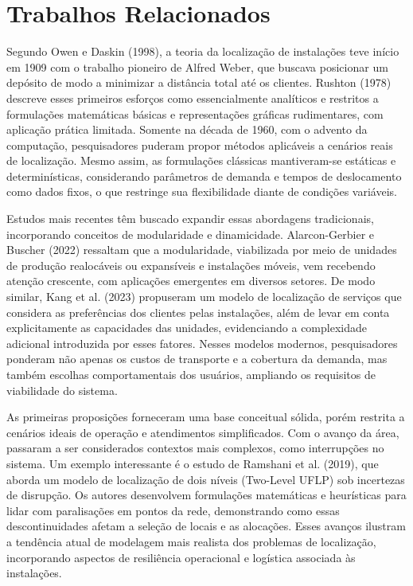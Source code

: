 \documentclass[12pt]{article}
\begin{document}
\section{Trabalhos Relacionados}

Segundo Owen e Daskin (1998), a teoria da localização de instalações teve início em 1909 com o trabalho pioneiro de Alfred Weber, que buscava posicionar um depósito de modo a minimizar a distância total até os clientes. Rushton (1978) descreve esses primeiros esforços como essencialmente analíticos e restritos a formulações matemáticas básicas e representações gráficas rudimentares, com aplicação prática limitada. Somente na década de 1960, com o advento da computação, pesquisadores puderam propor métodos aplicáveis a cenários reais de localização. Mesmo assim, as formulações clássicas mantiveram-se estáticas e determinísticas, considerando parâmetros de demanda e tempos de deslocamento como dados fixos, o que restringe sua flexibilidade diante de condições variáveis.

Estudos mais recentes têm buscado expandir essas abordagens tradicionais, incorporando conceitos de modularidade e dinamicidade. Alarcon-Gerbier e Buscher (2022) ressaltam que a modularidade, viabilizada por meio de unidades de produção realocáveis ou expansíveis e instalações móveis, vem recebendo atenção crescente, com aplicações emergentes em diversos setores. De modo similar, Kang et al. (2023) propuseram um modelo de localização de serviços que considera as preferências dos clientes pelas instalações, além de levar em conta explicitamente as capacidades das unidades, evidenciando a complexidade adicional introduzida por esses fatores. Nesses modelos modernos, pesquisadores ponderam não apenas os custos de transporte e a cobertura da demanda, mas também escolhas comportamentais dos usuários, ampliando os requisitos de viabilidade do sistema.

As primeiras proposições forneceram uma base conceitual sólida, porém restrita a cenários ideais de operação e atendimentos simplificados. Com o avanço da área, passaram a ser considerados contextos mais complexos, como interrupções no sistema. Um exemplo interessante é o estudo de Ramshani et al. (2019), que aborda um modelo de localização de dois níveis (Two-Level UFLP) sob incertezas de disrupção. Os autores desenvolvem formulações matemáticas e heurísticas para lidar com paralisações em pontos da rede, demonstrando como essas descontinuidades afetam a seleção de locais e as alocações. Esses avanços ilustram a tendência atual de modelagem mais realista dos problemas de localização, incorporando aspectos de resiliência operacional e logística associada às instalações.
\end{document}

